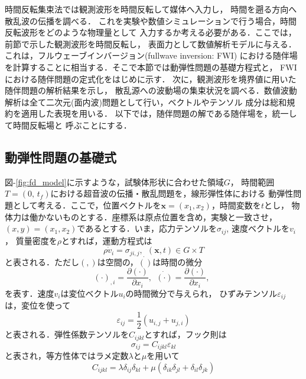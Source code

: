 時間反転集束法では観測波形を時間反転して媒体へ入力し，
時間を遡る方向へ散乱波の伝播を調べる．
これを実験や数値シミュレーションで行う場合，時間反転波形をどのような物理量として
入力するか考える必要がある．ここでは，前節で示した観測波形を時間反転し，
表面力として数値解析モデルに与える．これは，フルウェーブインバージョン(fullwave inversion: FWI)
における随伴場を計算することに相当する．そこで本節では動弾性問題の基礎方程式と，
FWIにおける随伴問題の定式化をはじめに示す． 次に，観測波形を境界値に用いた随伴問題の解析結果を示し，
散乱源への波動場の集束状況を調べる．数値波動解析は全て二次元(面内波)問題として行い，ベクトルやテンソル
成分は総和規約を適用した表現を用いる． 以下では，随伴問題の解である随伴場を，統一して時間反転場と
呼ぶことにする．
\subsection{動弾性問題の基礎式}
{\rm 図}-\ref{fig:fd_model}に示すような，試験体形状に合わせた領域$G$，
時間範囲$T=(0,\, t_f)$における超音波の伝播・散乱問題を，線形弾性体における
動弾性問題として考える．ここで，位置ベクトルを$\boldsymbol{x}=(x_1,x_2)$，時間変数を$t$とし，
物体力は働かないものとする．座標系は原点位置を含め，実験と一致させ，
$(x,y)=(x_1,x_2)$であるとする．いま，応力テンソルを$\sigma_{ij}$, 速度ベクトルを$v_i$，
質量密度を$\rho$とすれば，運動方程式は
\begin{equation}
	\rho \dot{v}_i=\sigma_{ji,j}, \ \ (\boldsymbol{x},t)\in G\times T
	\label{eqn:}
\end{equation}
と表される．ただし$(,)$は空間の，$\dot{()}$は時間の微分
\begin{equation}
	(\cdot)_{,i}=\frac{\partial (\cdot)}{\partial x_i}, \ \ 
	\dot{(\cdot)}=\frac{\partial (\cdot)}{\partial x_i}, \ \ 
	\label{eqn:}
\end{equation}
を表す．速度$v_i$は変位ベクトル$u_i$の時間微分で与えられ，
ひずみテンソル$\varepsilon_{ij}$は，変位を使って
\begin{equation}
	\varepsilon_{ij}=\frac{1}{2}(u_{i,j}+u_{j,i})
	\label{eqn:FWD}
\end{equation}
と表される．弾性係数テンソルを$C_{ijkl}$とすれば，フック則は
\begin{equation}
	\sigma_{ij}=C_{ijkl}\varepsilon_{kl}
	\label{eqn:}
\end{equation}
と表され，等方性体ではラメ定数$\lambda$と$\mu$を用いて
\begin{equation}
	C_{ijkl}=\lambda \delta_{ij}\delta_{kl} +
	\mu (
	\delta_{ik}\delta_{jl}
	+
	\delta_{il}\delta_{jk} 
	)
	\label{eqn:Cijkl_iso}
\end{equation}
